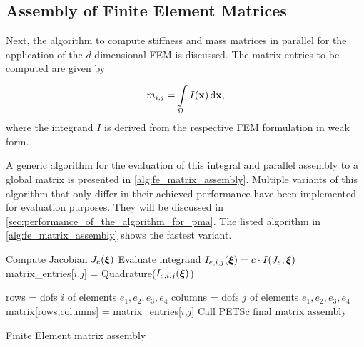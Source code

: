 \subsection{Assembly of Finite Element Matrices}\label{sec:assembly_of_finite_element_matrices}

Next, the algorithm to compute stiffness and mass matrices in parallel for the application of the $d$-dimensional FEM is discussed.
The matrix entries to be computed are given by%
\begin{align}\label{eq:alg_assembly_m}
  m_{i,j} = \i{\Omega}{} I(\bfx) \,\d\bfx,
\end{align}
where the integrand $I$ is derived from the respective FEM formulation in weak form.

A generic algorithm for the evaluation of this integral and parallel assembly to a global matrix is presented in \cref{alg:fe_matrix_assembly}. Multiple variants of this algorithm that only differ in their achieved performance have been implemented for evaluation purposes. They will be discussed in \cref{sec:performance_of_the_algorithm_for_pma}. The listed algorithm in \cref{alg:fe_matrix_assembly} shows the fastest variant.

\begin{algorithm}
  \begin{algorithmic}[1]%
          \label{line:4.2}
                                    \label{line:4.3}
        \State Compute Jacobian $J_e(\boldsymbol{\xi})$                    \label{line:4.4}
        \State Evaluate integrand $I_{e,i,j}(\boldsymbol{\xi}) = c\cdot I(J_e,\boldsymbol{\xi})$                     \label{line:4.5}
      \EndFor
      \State matrix\_entries[$i$,$j$] = Quadrature($I_{e,i,j}(\boldsymbol{\xi})$)                       \label{line:4.6}
      
                            \label{line:4.7}
                            \label{line:4.8}
          \State rows \hspace*{4.1mm} = dofs $i$ of elements $e_1,e_2,e_3,e_4$                    \label{line:4.9}
          \State columns = dofs $j$ of elements $e_1,e_2,e_3,e_4$  \label{line:4.10}
          \State matrix[rows,columns] = matrix\_entries[$i$,$j$]   \label{line:4.11}
        \EndFor
      \EndFor
    \EndFor
    \State Call PETSc final matrix assembly                    \label{line:4.12}
    \EndProcedure
  \end{algorithmic}%
  \caption{Finite Element matrix assembly}%
  \label{alg:fe_matrix_assembly}%
\end{algorithm}%

